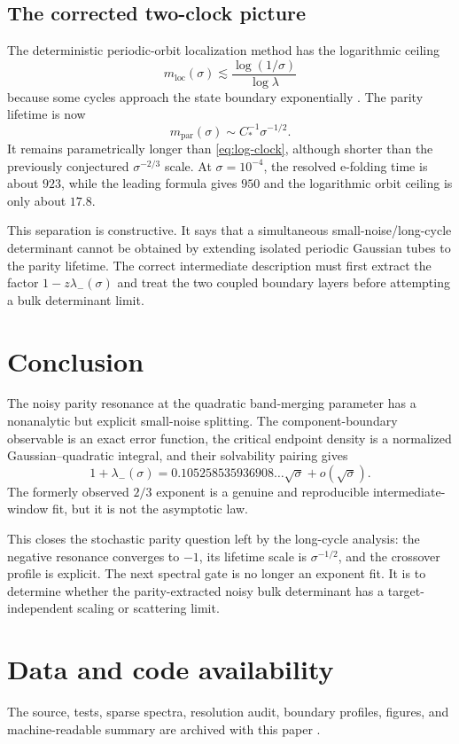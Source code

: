 \documentclass[11pt]{article}
\theoremstyle{definition}
\theoremstyle{remark}
\begin{document}
\subsection{The corrected two-clock picture}

The deterministic periodic-orbit localization method has the logarithmic
ceiling
\begin{equation}\label{eq:log-clock}
 m_{\mathrm{loc}}(\sigma)
 \lesssim\frac{\log(1/\sigma)}{\log\lambda}
\end{equation}
because some cycles approach the state boundary exponentially
\citep{WangLongCycle2026}.  The parity lifetime is now
\begin{equation}\label{eq:sqrt-clock}
 m_{\mathrm{par}}(\sigma)
 \sim C_*^{-1}\sigma^{-1/2}.
\end{equation}
It remains parametrically longer than \eqref{eq:log-clock}, although shorter
than the previously conjectured $\sigma^{-2/3}$ scale.  At
$\sigma=10^{-4}$, the resolved e-folding time is about $923$, while the
leading formula gives $950$ and the logarithmic orbit ceiling is only about
$17.8$.

This separation is constructive.  It says that a simultaneous
small-noise/long-cycle determinant cannot be obtained by extending isolated
periodic Gaussian tubes to the parity lifetime.  The correct intermediate
description must first extract the factor
$1-z\lambda_-(\sigma)$ and treat the two coupled boundary layers before
attempting a bulk determinant limit.

\section{Conclusion}

The noisy parity resonance at the quadratic band-merging parameter has a
nonanalytic but explicit small-noise splitting.  The component-boundary
observable is an exact error function, the critical endpoint density is a
normalized Gaussian--quadratic integral, and their solvability pairing gives
\[
 1+\lambda_-(\sigma)
 =0.105258535936908\ldots\sqrt\sigma+o(\sqrt\sigma).
\]
The formerly observed $2/3$ exponent is a genuine and reproducible
intermediate-window fit, but it is not the asymptotic law.

This closes the stochastic parity question left by the long-cycle analysis:
the negative resonance converges to $-1$, its lifetime scale is
$\sigma^{-1/2}$, and the crossover profile is explicit.  The next spectral
gate is no longer an exponent fit.  It is to determine whether the
parity-extracted noisy bulk determinant has a target-independent scaling or
scattering limit.

\section*{Data and code availability}

The source, tests, sparse spectra, resolution audit, boundary profiles,
figures, and machine-readable summary are archived with this paper
\citep{WangBoundaryLayerCode2026}.



\end{document}
